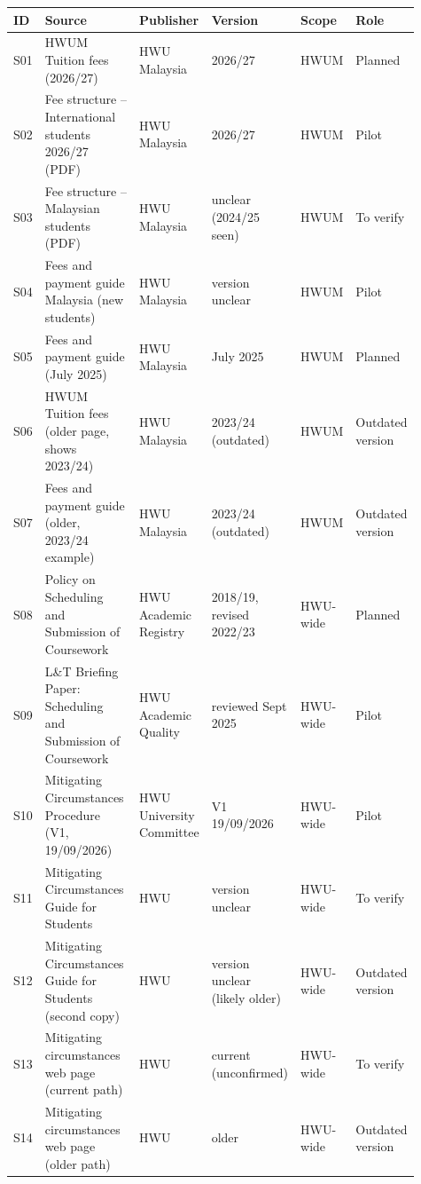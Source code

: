 \begin{minipage}{15.29cm}\setlength{\linewidth}{15.29cm}\scriptsize\setlength{\tabcolsep}{3pt}
\begin{tabular}{L{0.05\linewidth}L{0.35\linewidth}L{0.165\linewidth}L{0.15\linewidth}L{0.1\linewidth}L{0.1\linewidth}}
\toprule
ID & Source & Publisher & Version & Scope & Role \\
\midrule

S01 & HWUM Tuition fees (2026/27) & HWU Malaysia & 2026/27 & HWUM & Planned \\
S02 & Fee structure -- International students 2026/27 (PDF) & HWU Malaysia & 2026/27 & HWUM & Pilot \\
S03 & Fee structure -- Malaysian students (PDF) & HWU Malaysia & unclear (2024/25 seen) & HWUM & To verify \\
S04 & Fees and payment guide Malaysia (new students) & HWU Malaysia & version unclear & HWUM & Pilot \\
S05 & Fees and payment guide (July 2025) & HWU Malaysia & July 2025 & HWUM & Planned \\
S06 & HWUM Tuition fees (older page, shows 2023/24) & HWU Malaysia & 2023/24 (outdated) & HWUM & Outdated version \\
S07 & Fees and payment guide (older, 2023/24 example) & HWU Malaysia & 2023/24 (outdated) & HWUM & Outdated version \\
S08 & Policy on Scheduling and Submission of Coursework & HWU Academic Registry & 2018/19, revised 2022/23 & HWU-wide & Planned \\
S09 & L\&T Briefing Paper: Scheduling and Submission of Coursework & HWU Academic Quality & reviewed Sept 2025 & HWU-wide & Pilot \\
S10 & Mitigating Circumstances Procedure (V1, 19/09/2026) & HWU University Committee & V1 19/09/2026 & HWU-wide & Pilot \\
S11 & Mitigating Circumstances Guide for Students & HWU & version unclear & HWU-wide & To verify \\
S12 & Mitigating Circumstances Guide for Students (second copy) & HWU & version unclear (likely older) & HWU-wide & Outdated version \\
S13 & Mitigating circumstances web page (current path) & HWU & current (unconfirmed) & HWU-wide & To verify \\
S14 & Mitigating circumstances web page (older path) & HWU & older & HWU-wide & Outdated version \\

\end{tabular}
\end{minipage}
